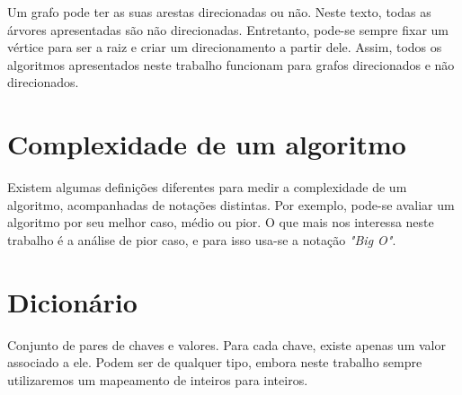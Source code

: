 Um grafo pode ter as suas arestas direcionadas ou não. Neste texto, todas as árvores apresentadas são não direcionadas. Entretanto, pode-se sempre fixar um vértice para ser a raiz e criar um direcionamento a partir dele. Assim, todos os algoritmos apresentados neste trabalho funcionam para grafos direcionados e não direcionados.

\section{Complexidade de um algoritmo}

Existem algumas definições diferentes para medir a complexidade de um 
algoritmo, acompanhadas de notações distintas. Por exemplo, pode-se avaliar um 
algoritmo por seu melhor caso, médio ou pior. O que mais nos interessa neste 
trabalho é a análise de pior caso, e para isso usa-se a notação \emph{"Big O"}.

\section{Dicionário}

Conjunto de pares de chaves e valores. Para cada chave, existe apenas um valor associado a ele. Podem ser de qualquer tipo, embora neste trabalho sempre utilizaremos um mapeamento de inteiros para inteiros.